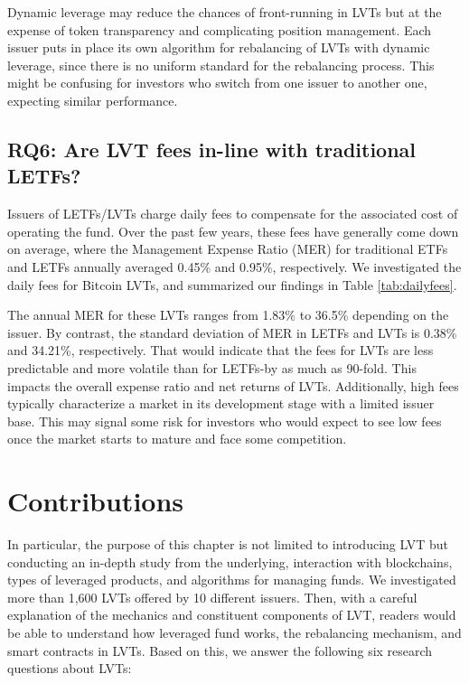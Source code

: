 Dynamic leverage may reduce the chances of front-running in LVTs but at the expense of token transparency and complicating position management. Each issuer puts in place its own algorithm for rebalancing of LVTs with dynamic leverage, since there is no uniform standard for the rebalancing process. This might be confusing for investors who switch from one issuer to another one, expecting similar performance.


\subsection{RQ6: Are LVT fees in-line with traditional LETFs?}\label{subsec:fees}
Issuers of LETFs/LVTs charge daily fees to compensate for the associated cost of operating the fund. Over the past few years, these fees have generally come down on average, where the Management Expense Ratio (MER) for traditional ETFs and LETFs annually averaged 0.45\% and 0.95\%, respectively. We investigated the daily fees for Bitcoin LVTs, and summarized our findings in Table \ref{tab:dailyfees}. 

The annual MER for these LVTs ranges from 1.83\% to 36.5\% depending on the issuer. By contrast, the standard deviation of MER in LETFs and LVTs is 0.38\% and 34.21\%, respectively. That would indicate that the fees for LVTs are less predictable and more volatile than for LETFs-by as much as 90-fold. This impacts the overall expense ratio and net returns of LVTs. Additionally, high fees typically characterize a market in its development stage with a limited issuer base. This may signal some risk for investors who would expect to see low fees once the market starts to mature and face some competition.

\section{Contributions}
In particular, the purpose of this chapter is not limited to introducing LVT but conducting an in-depth study from the underlying, interaction with blockchains, types of leveraged products, and algorithms for managing funds. We investigated more than 1,600 LVTs offered by 10 different issuers. Then, with a careful explanation of the mechanics and constituent components of LVT, readers would be able to understand how leveraged fund works, the rebalancing mechanism, and smart contracts in LVTs. Based on this, we answer the following six research questions about LVTs:

